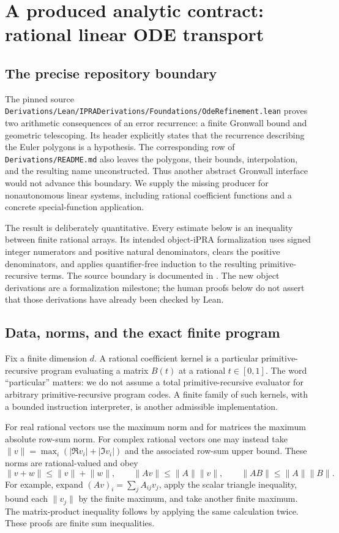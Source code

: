 \section{A produced analytic contract: rational linear ODE transport}
\label{sec:ode-producer}

\subsection{The precise repository boundary}

The pinned source
\nolinkurl{Derivations/Lean/IPRADerivations/Foundations/OdeRefinement.lean}
proves two arithmetic consequences of an error recurrence: a finite
Gronwall bound and geometric telescoping. Its header explicitly states that
the recurrence describing the Euler polygons is a hypothesis. The corresponding
row of \nolinkurl{Derivations/README.md} also leaves the polygons, their bounds,
interpolation, and the resulting name unconstructed. Thus another abstract
Gronwall interface would not advance this boundary. We supply the missing
producer for nonautonomous linear systems, including rational coefficient
functions and a concrete special-function application.

The result is deliberately quantitative. Every estimate below is an inequality
between finite rational arrays. Its intended object-iPRA formalization uses
signed integer numerators and positive natural denominators, clears the
positive denominators, and applies quantifier-free induction to the resulting
primitive-recursive terms. The source boundary is documented in \cite{repo-ode,repo-gronwall}. The new object derivations are a formalization
milestone; the human proofs below do not assert that those derivations have
already been checked by Lean.

\subsection{Data, norms, and the exact finite program}

Fix a finite dimension $d$. A rational coefficient kernel is a particular
primitive-recursive program evaluating a matrix $B(t)$ at a rational
$t\in[0,1]$. The word ``particular'' matters: we do not assume a total
primitive-recursive evaluator for arbitrary primitive-recursive program codes.
A finite family of such kernels, with a bounded instruction interpreter, is
another admissible implementation.

For real rational vectors use the maximum norm and for matrices the maximum
absolute row-sum norm. For complex rational vectors one may instead take
$\lVert v\rVert=\max_i(|\Re v_i|+|\Im v_i|)$ and the associated row-sum
upper bound. These norms are rational-valued and obey
\[
 \lVert v+w\rVert\le\lVert v\rVert+\lVert w\rVert,\qquad
 \lVert Av\rVert\le\lVert A\rVert\lVert v\rVert,\qquad
 \lVert AB\rVert\le\lVert A\rVert\lVert B\rVert.
\]
For example, expand $(Av)_i=\sum_jA_{ij}v_j$, apply the scalar triangle
inequality, bound each $\lVert v_j\rVert$ by the finite maximum, and take
another finite maximum. The matrix-product inequality follows by applying
the same calculation twice. These proofs are finite sum inequalities.

